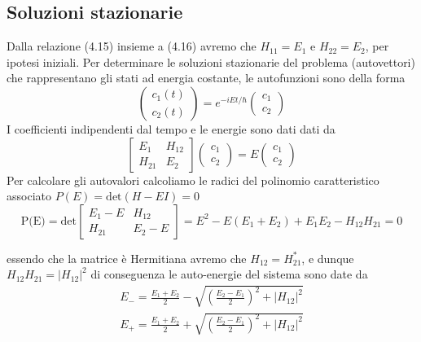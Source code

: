 \subsection{Soluzioni stazionarie}
Dalla relazione (4.15) insieme a (4.16) avremo che $H_{11} = E_1$ e $H_{22} = E_2$, per ipotesi iniziali.
Per determinare le soluzioni stazionarie del problema (autovettori) che rappresentano gli stati ad energia costante, le autofunzioni sono della forma
\begin{equation*}
	\left( \begin{array}{c}
	c_1(t) \\
	c_2(t)	
	\end{array}\right) = e^{-iEt / \hbar} \left( \begin{array}{c}
	c_1 \\
	c_2	
	\end{array}\right )
\end{equation*} 
I coefficienti indipendenti dal tempo e le energie sono dati dati da 
\begin{equation}
	\left [ \begin{array}{cc} 
		E_{1} & H_{12} \\ H_{21} & E_{2}
	\end{array}\right ] \left( \begin{array}{c} c_1 \\ c_2 \end{array}\right) = E \left ( \begin{array}{c} c_1 \\ c_2 \end{array}\right) 
\end{equation}
Per calcolare gli autovalori calcoliamo le radici del polinomio caratteristico associato $P(E) = \text{det}(H-EI) = 0$
\begin{equation*}
	\text{P(E)} = \text{det}	\left [ \begin{array}{cc} 
		E_{1}-E & H_{12} \\ H_{21} & E_{2}-E
	\end{array}\right ] = E^2 - E(E_1+E_2) +E_1E_2 - H_{12}H_{21} = 0
\end{equation*}
\newpage

essendo che la matrice \`e Hermitiana avremo che $H_{12} = H_{21}^*$, e dunque $H_{12}H_{21} =|H_{12}|^2$ di conseguenza le auto-energie del sistema sono date da 
\begin{align*}
	E_- = \frac{E_1 + E_2}{2} - \sqrt{\left( \frac{E_2 - E_1}{2}\right)^2 + |H_{12}|^2}\\[0.5cm]
	E_+ = \frac{E_1 + E_2}{2} + \sqrt{\left( \frac{E_2 - E_1}{2}\right)^2 + |H_{12}|^2}
\end{align*}


